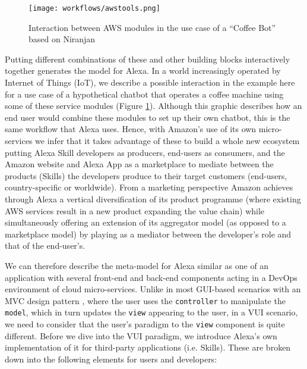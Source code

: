 \clearpage


\begin{figure}[h!]
	\caption[Interaction Between AWS Modules (Coffee Bot)]{Interaction between AWS modules in the use case of a ``Coffee Bot'' based on Niranjan \cite{aws:lex_webinar} }\label{lex_interactionExample}
	\centering
	\texttt{[image: workflows/awstools.png]}
\end{figure}
%




Putting different combinations of these and other building blocks interactively together generates the model for Alexa. In a world increasingly operated by Internet of Things (IoT), we describe a possible interaction in the example here for a use case of a hypothetical chatbot that operates a coffee machine using some of these service modules (Figure \ref{lex_interactionExample}).  Although this graphic describes how an end user would combine these modules to set up their own chatbot, this is the same workflow that Alexa uses. Hence, with Amazon's use of its own micro-services we infer that it takes advantage of these to build a whole new ecosystem putting Alexa Skill developers as producers, end-users as consumers, and the Amazon website and Alexa App as a marketplace to mediate between the products (Skills) the developers produce to their target customers (end-users, country-specific or worldwide). From a marketing perspective Amazon achieves through Alexa a vertical diversification of its product programme (where existing AWS services result in a new product expanding the value chain) while simultaneously offering an extension of its aggregator model (as opposed to a marketplace model) %
 by playing as a mediator between the developer's role and that of the end-user's. %




We can therefore describe the meta-model for Alexa similar as one %
of an application with several front-end and back-end components acting in a DevOps environment of cloud micro-services. Unlike in most GUI-based scenarios with an MVC design pattern \cite{wiki:mvc}, where the user uses the \texttt{controller} to manipulate the \texttt{model}, which in turn updates the \texttt{view} appearing to the user, in a VUI scenario, we need to consider that the user's paradigm to the \texttt{view} component is quite different. Before we dive into the VUI paradigm, we introduce Alexa's own implementation of it for third-party applications (i.e. Skills). These are broken down into the following elements for users and developers: %




